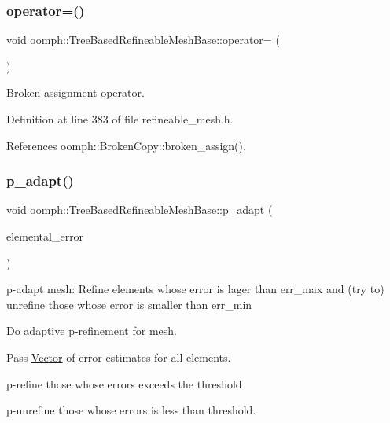 \subsubsection{\texorpdfstring{operator=()}{operator=()}}
{\footnotesize\ttfamily void oomph\+::\+Tree\+Based\+Refineable\+Mesh\+Base\+::operator= (\begin{DoxyParamCaption}\item[{const \hyperlink{classoomph_1_1TreeBasedRefineableMeshBase}{Tree\+Based\+Refineable\+Mesh\+Base} \&}]{ }\end{DoxyParamCaption})\hspace{0.3cm}{\ttfamily [inline]}}



Broken assignment operator. 



Definition at line 383 of file refineable\+\_\+mesh.\+h.



References oomph\+::\+Broken\+Copy\+::broken\+\_\+assign().

\mbox{\label{classoomph_1_1TreeBasedRefineableMeshBase_acec4254dc1b7c75870cfa0bd0c4e363e}} 
\subsubsection{\texorpdfstring{p\+\_\+adapt()}{p\_adapt()}}
{\footnotesize\ttfamily void oomph\+::\+Tree\+Based\+Refineable\+Mesh\+Base\+::p\+\_\+adapt (\begin{DoxyParamCaption}\item[{const \hyperlink{classoomph_1_1Vector}{Vector}$<$ double $>$ \&}]{elemental\+\_\+error }\end{DoxyParamCaption})\hspace{0.3cm}{\ttfamily [virtual]}}



p-\/adapt mesh\+: Refine elements whose error is lager than err\+\_\+max and (try to) unrefine those whose error is smaller than err\+\_\+min 

Do adaptive p-\/refinement for mesh.
\begin{DoxyItemize}
\item Pass \hyperlink{classoomph_1_1Vector}{Vector} of error estimates for all elements.
\item p-\/refine those whose errors exceeds the threshold
\item p-\/unrefine those whose errors is less than threshold. 
\end{DoxyItemize}

